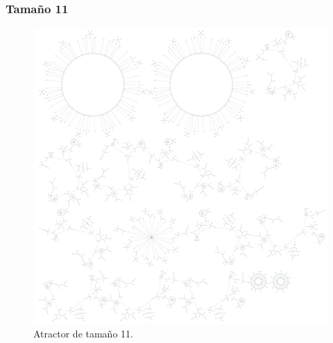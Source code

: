 \documentclass[11pt]{article}
\begin{document}
			\subsubsection{Tamaño 11}
			\begin{figure}[H]
			\centering
			\includegraphics[scale=0.1]{resources/Atractores54/atractor_54_size_11.png}
			\caption{Atractor de tamaño 11.}\label{fig:picture}
			\end{figure}
\end{document}

